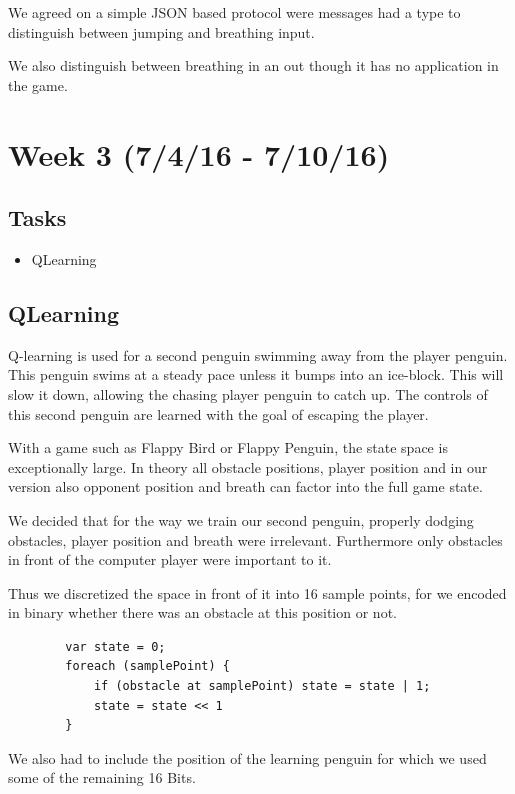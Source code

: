 \documentclass{article}
\begin{document}
        We agreed on a simple JSON based protocol were messages had a type to distinguish between jumping and breathing input.

        We also distinguish between breathing in an out though it has no application in the game.

\section{Week 3 (7/4/16 - 7/10/16)}
    \subsection{Tasks}
    \begin{itemize}
        \item QLearning
    \end{itemize}

    \subsection{QLearning}
        Q-learning is used for a second penguin swimming away from the player penguin. This penguin swims at a steady pace unless it bumps into an ice-block. This will slow it down, allowing the chasing player penguin to catch up. The controls of this second penguin are learned with the goal of escaping the player.

        With a game such as Flappy Bird or Flappy Penguin, the state space is exceptionally large. In theory all obstacle positions, player position and in our version also opponent position and breath can factor into the full game state.

        We decided that for the way we train our second penguin, properly dodging obstacles, player position and breath were irrelevant. Furthermore only obstacles in front of the computer player were important to it.

        Thus we discretized the space in front of it into 16 sample points, for we encoded in binary whether there was an obstacle at this position or not.

        \begin{lstlisting}
        var state = 0;
        foreach (samplePoint) {
            if (obstacle at samplePoint) state = state | 1;
            state = state << 1
        }
        \end{lstlisting}

        We also had to include the position of the learning penguin for which we used some of the remaining 16 Bits.
\end{document}
